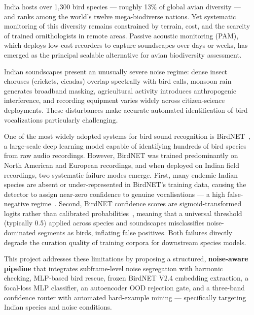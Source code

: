 \documentclass[a4paper,12pt]{article}
\begin{document}
\noindent
India hosts over 1,300 bird species --- roughly 13\% of global avian diversity --- and ranks among the
world's twelve mega-biodiverse nations. Yet systematic monitoring of this diversity remains constrained
by terrain, cost, and the scarcity of trained ornithologists in remote areas. Passive acoustic monitoring
(PAM), which deploys low-cost recorders to capture soundscapes over days or weeks, has emerged as the
principal scalable alternative for avian biodiversity assessment.

\vspace{0.3cm}

\noindent
Indian soundscapes present an unusually severe noise regime: dense insect choruses (crickets, cicadas)
overlap spectrally with bird calls, monsoon rain generates broadband masking, agricultural activity
introduces anthropogenic interference, and recording equipment varies widely across citizen-science
deployments. These disturbances make accurate automated identification of bird vocalizations
particularly challenging.

\vspace{0.3cm}

\noindent
One of the most widely adopted systems for bird sound recognition is BirdNET~\cite{BirdNET}, a large-scale
deep learning model capable of identifying hundreds of bird species from raw audio recordings. However,
BirdNET was trained predominantly on North American and European recordings, and when deployed on Indian
field recordings, two systematic failure modes emerge. First, many endemic Indian species are absent or
under-represented in BirdNET's training data, causing the detector to assign near-zero confidence to
genuine vocalisations --- a high false-negative regime~\cite{WoodKahl}. Second, BirdNET confidence scores
are sigmoid-transformed logits rather than calibrated probabilities~\cite{WoodKahl}, meaning that a
universal threshold (typically 0.5) applied across species and soundscapes misclassifies noise-dominated
segments as birds, inflating false positives. Both failures directly degrade the curation quality of
training corpora for downstream species models.

\vspace{0.3cm}

\noindent
This project addresses these limitations by proposing a structured, \textbf{noise-aware pipeline} that
integrates subframe-level noise segregation with harmonic checking, MLP-based bird rescue, frozen BirdNET
V2.4 embedding extraction, a focal-loss MLP classifier, an autoencoder OOD rejection gate, and a
three-band confidence router with automated hard-example mining --- specifically targeting Indian species
and noise conditions.
\end{document}
